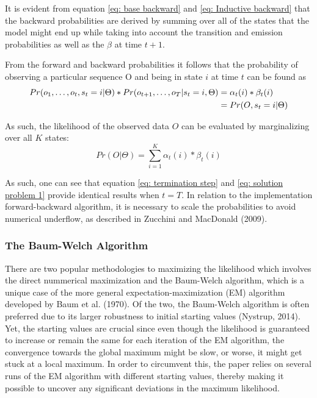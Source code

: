It is evident from equation \ref{eq: base backward} and \ref{eq: Inductive backward} that the backward probabilities are derived by summing over all of the states that the model might end up while taking into account the transition and emission probabilities as well as the $\beta$ at time $t+1$.

From the forward and backward probabilities it follows that the probability of observing a particular sequence O and being in state $i$ at time $t$ can be found as
\begin{align}
    Pr(o_1,\ldots,o_t, s_t = i | \Theta) * 
    Pr(o_{t+1},\ldots,o_T | s_t = i, \Theta)
     &=\alpha_t(i) * \beta_t(i) \\
     &= Pr(O, s_t = i |\Theta)  \notag
\end{align}

As such, the likelihood of the observed data $O$ can be evaluated by marginalizing over all $K$ states:
\begin{equation}
    Pr(O | \Theta) = \sum_{i=1}^K \alpha_t(i) * \beta_t(i)
    \label{eq: solution problem 1}
\end{equation}

As such, one can see that equation \ref{eq: termination step} and \ref{eq: solution problem 1} provide identical results when $t=T$. In relation to the implementation forward-backward algorithm, it is necessary to scale the probabilities to avoid numerical
underflow, as described in Zucchini and MacDonald (2009). 

\subsubsection{The Baum-Welch Algorithm}
There are two popular methodologies to maximizing the likelihood which involves the direct nummerical maximization and the Baum-Welch algorithm, which is a unique case of the more general expectation-maximization (EM) algorithm developed by Baum et al. (1970). Of the two, the Baum-Welch algorithm is often preferred due to its larger robustness to initial starting values (Nystrup, 2014). Yet, the starting values are crucial since even though the likelihood is guaranteed to increase or remain the same for each iteration of the EM algorithm, the convergence towards the global maximum might be slow, or worse, it might get stuck at a local maximum. In order to circumvent this, the paper relies on several runs of the EM algorithm with different starting values, thereby making it possible to uncover any significant deviations in the maximum likelihood. 

